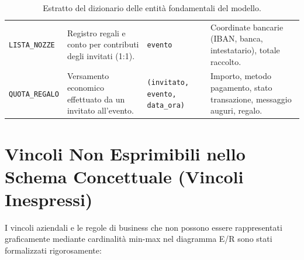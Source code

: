 \begin{table}[h!]
\begin{tabularx}{\textwidth}{l p{4cm} p{3.5cm} X}
\addlinespace
\texttt{LISTA\_NOZZE} & Registro regali e conto per contributi degli invitati (1:1). & \texttt{evento} & Coordinate bancarie (IBAN, banca, intestatario), totale raccolto. \\
\addlinespace
\texttt{QUOTA\_REGALO} & Versamento economico effettuato da un invitato all'evento. & \texttt{(invitato, evento, data\_ora)} & Importo, metodo pagamento, stato transazione, messaggio auguri, regalo. \\
\bottomrule
\end{tabularx}
\caption{Estratto del dizionario delle entità fondamentali del modello.}
\label{tab:dizionario_entita}
\end{table}

\section{Vincoli Non Esprimibili nello Schema Concettuale (Vincoli Inespressi)}
I vincoli aziendali e le regole di business che non possono essere rappresentati graficamente mediante cardinalità min-max nel diagramma E/R sono stati formalizzati rigorosamente:

